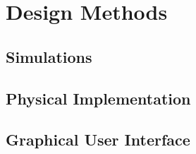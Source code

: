 
\section{Design Methods}

\subsection{Simulations}

\subsection{Physical Implementation}


\subsection{Graphical User Interface}

